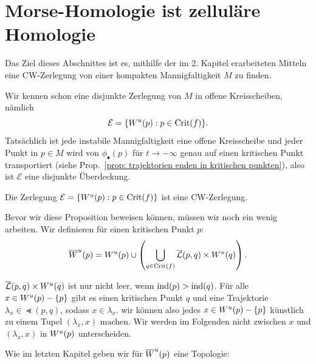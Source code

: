 \section{Morse-Homologie ist zelluläre Homologie}

Das Ziel dieses Abschnittes ist es, mithilfe der im 2. Kapitel erarbeiteten Mitteln eine 
CW-Zerlegung von einer kompakten Mannigfaltigkeit $M$ zu finden.

Wir kennen schon eine disjunkte Zerlegung von $M$ in offene Kreisscheiben, nämlich
\[ \mathcal{E} = \{ { W^u } (p): p \in { \operatorname{Crit} } (f) \} . \]
Tatsächlich ist jede instabile Mannigfaltigkeit eine offene Kreisscheibe und jeder Punkt in 
$ p \in M$ wird von $\phi_{\bullet}(p)$ für $t \to - \infty$ genau auf einen kritischen Punkt 
transportiert (siehe Prop.~\ref{prop: trajektorien enden in kritischen punkten}), also ist 
$\mathcal{E}$ eine disjunkte Überdeckung.

\begin{prop}
    \label{prop: cw-zerlegung}
    Die Zerlegung $\mathcal{E} = \{ { W^u } (p): p \in { \operatorname{Crit} } (f) \}$ ist eine CW-Zerlegung.
\end{prop}

Bevor wir diese Proposition beweisen können, müssen wir noch ein wenig arbeiten.
Wir definieren für einen kritischen Punkt $p$:
\[ { \overline{W}^u } (p) = 
    { W^u } (p) \cup \left( \bigcup_{q \in { \operatorname{Crit} } (f)} {\overline{\mathcal{L}} } (p, q) \times { W^u } (q) \right) . \]

${\overline{\mathcal{L}} } (p, q) \times { W^u } (q)$ ist nur nicht leer, wenn ${ \operatorname{ind} } (p) > { \operatorname{ind} } (q)$.
Für alle $x \in { W^u } (p) - \{ p \}$ gibt es einen kritischen Punkt $q$ und eine Trajektorie 
$\lambda_x \in \Lt (p, q)$, sodass $x \in \lambda_x$. wir können also jedes 
$x \in { W^u } (p) - \{ p \}$ künstlich zu einem Tupel $(\lambda_x, x)$ machen. Wir werden im Folgenden
nicht zwischen $x$ und $(\lambda_x, x)$ in ${ W^u } (p)$ unterscheiden.

Wie im letzten Kapitel geben wir für ${ \overline{W}^u } (p)$ eine Topologie:

